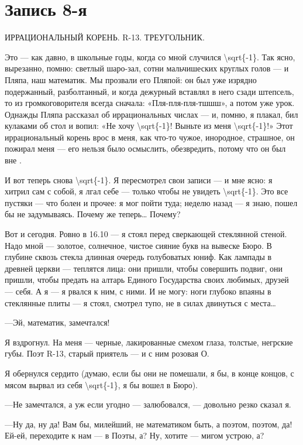 \documentclass[11pt,openany]{book}
\newcommand{\bookchapterplain}[1]{%
  \clearpage\phantomsection\chapter*{#1}%
  \addcontentsline{toc}{chapter}{#1}\markboth{#1}{#1}\thispagestyle{plain}}
\begin{document}
\bookchapterplain{Запись 8-я}

\begin{center}\textsc{ИРРАЦИОНАЛЬНЫЙ КОРЕНЬ. R-13. ТРЕУГОЛЬНИК.}\end{center}

Это --- как давно, в школьные годы, когда со мной случился \textbackslash{}sqrt\{-1\}. Так ясно, вырезанно, помню: светлый шаро-зал, сотни мальчишеских круглых голов --- и Пляпа, наш математик. Мы прозвали его Пляпой: он был уже изрядно подержанный, разболтанный, и когда дежурный вставлял в него сзади штепсель, то из громкоговорителя всегда сначала: «Пля-пля-пля-тшшш», а потом уже урок. Однажды Пляпа рассказал об иррациональных числах --- и, помню, я плакал, бил кулаками об стол и вопил: «Не хочу \textbackslash{}sqrt\{-1\}! Выньте из меня \textbackslash{}sqrt\{-1\}!» Этот иррациональный корень врос в меня, как что-то чужое, инородное, страшное, он пожирал меня --- его нельзя было осмыслить, обезвредить, потому что он был вне .

И вот теперь снова \textbackslash{}sqrt\{-1\}. Я пересмотрел свои записи --- и мне ясно: я хитрил сам с собой, я лгал себе --- только чтобы не увидеть \textbackslash{}sqrt\{-1\}. Это все пустяки --- что болен и прочее: я мог пойти туда; неделю назад --- я знаю, пошел бы не задумываясь. Почему же теперь\ldots{} Почему?

Вот и сегодня. Ровно в 16.10 --- я стоял перед сверкающей стеклянной стеной. Надо мной --- золотое, солнечное, чистое сияние букв на вывеске Бюро. В глубине сквозь стекла длинная очередь голубоватых юниф. Как лампады в древней церкви --- теплятся лица: они пришли, чтобы совершить подвиг, они пришли, чтобы предать на алтарь Единого Государства своих любимых, друзей --- себя. А я --- я рвался к ним, с ними. И не могу: ноги глубоко впаяны в стеклянные плиты --- я стоял, смотрел тупо, не в силах двинуться с места\ldots{}

---Эй, математик, замечтался!

Я вздрогнул. На меня --- черные, лакированные смехом глаза, толстые, негрские губы. Поэт R-13, старый приятель --- и с ним розовая О.

Я обернулся сердито (думаю, если бы они не помешали, я бы, в конце концов, с мясом вырвал из себя \textbackslash{}sqrt\{-1\}, я бы вошел в Бюро).

---Не замечтался, а уж если угодно --- залюбовался, --- довольно резко сказал я.

---Ну да, ну да! Вам бы, милейший, не математиком быть, а поэтом, поэтом, да! Ей-ей, переходите к нам --- в Поэты, а? Ну, хотите --- мигом устрою, а?
\end{document}
